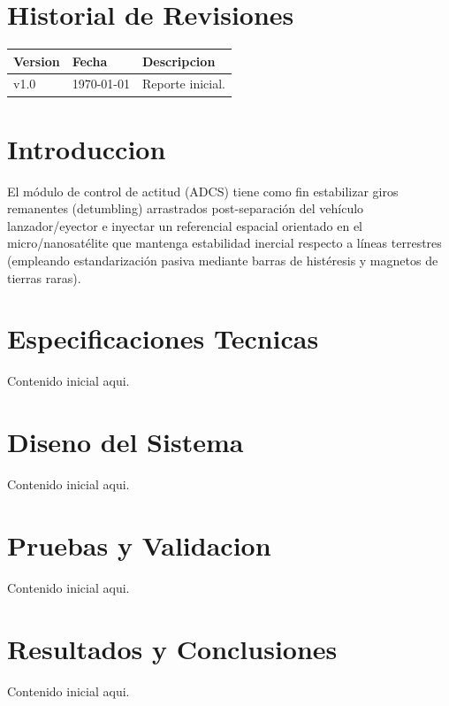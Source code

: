 \documentclass[a4paper, twoside, 12pt]{report}
\begin{document}

\begin{abstract}
    Escribe aqui el resumen ejecutivo del reporte.
\end{abstract}

\chapter*{Historial de Revisiones}
\begin{center}
\begin{tabular}{p{2cm} p{3cm} p{9cm}}
\toprule
\textbf{Version} & \textbf{Fecha} & \textbf{Descripcion} \\
\midrule
v1.0 & \today & Reporte inicial. \\
\bottomrule
\end{tabular}
\end{center}

\clearpage
\tableofcontents
\listoffigures
\listoftables
\clearpage


\chapter{Introduccion}
El módulo de control de actitud (ADCS) tiene como fin estabilizar giros remanentes (detumbling) arrastrados post-separación del vehículo lanzador/eyector e inyectar un referencial espacial orientado en el micro/nanosatélite que mantenga estabilidad inercial respecto a líneas terrestres (empleando estandarización pasiva mediante barras de histéresis y magnetos de tierras raras).

\chapter{Especificaciones Tecnicas}
Contenido inicial aqui.

\chapter{Diseno del Sistema}
Contenido inicial aqui.

\chapter{Pruebas y Validacion}
Contenido inicial aqui.

\chapter{Resultados y Conclusiones}
Contenido inicial aqui.

% 
% 
\end{document}
